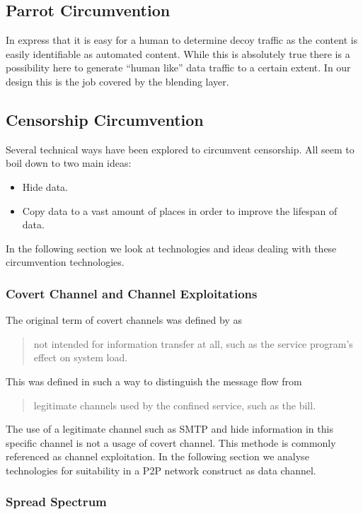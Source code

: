 \subsection{Parrot Circumvention}
In \cite{oakland2013-parrot} \citeauthor{oakland2013-parrot} express that it is easy for a human to determine decoy traffic as the content is easily identifiable as automated content. While this is absolutely true there is a possibility here to generate ``human like'' data traffic to a certain extent. In our design this is the job covered by the blending layer.

\subsection{Censorship Circumvention}
Several technical ways have been explored to circumvent censorship. All seem to boil down to two main ideas:
\begin{itemize}
	\item Hide data.
	\item Copy data to a vast amount of places in order to improve the lifespan of data.
\end{itemize}

In the following section we look at technologies and ideas dealing with these circumvention technologies.

\subsubsection{Covert Channel and Channel Exploitations}
The original term of covert channels was defined by \citeauthor{Lampson73anote}\cite{Lampson73anote} as 
\begin{quote}
	not intended for information transfer at all, such as the service program's effect on system load.
\end{quote}

This was defined  in such a way to distinguish the message flow from 
\begin{quote}
	legitimate channels used by the confined service, such as the bill.
\end{quote}

The use of a legitimate channel such as SMTP and hide information in this specific channel is not a usage of covert channel. This methode is commonly referenced as channel exploitation. In the following section we analyse technologies for suitability in a P2P network construct as data channel.

\subsubsection{Spread Spectrum}
\cite{viterbi1995cdma}

